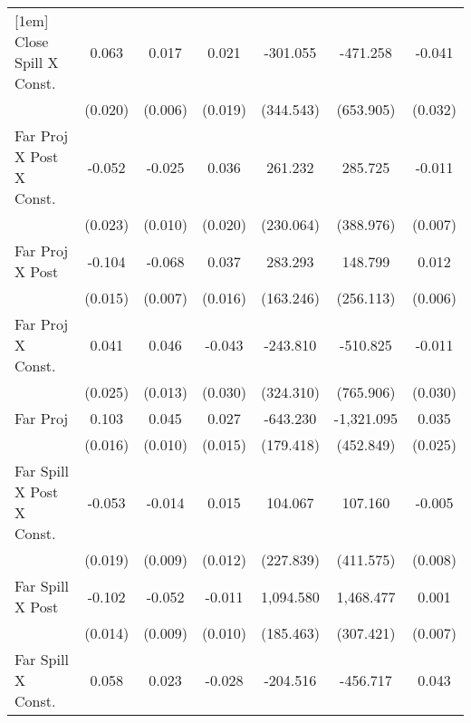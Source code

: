 {\begin{tabular}{l*{6}{c}}
[1em]
Close Spill X Const.&    0.063\sym{***}&    0.017\sym{***}&    0.021         & -301.055         & -471.258         &   -0.041         \\
                &  (0.020)         &  (0.006)         &  (0.019)         &(344.543)         &(653.905)         &  (0.032)         \\
[1em]
Far Proj X Post X Const.&   -0.052\sym{**} &   -0.025\sym{***}&    0.036\sym{*}  &  261.232         &  285.725         &   -0.011         \\
                &  (0.023)         &  (0.010)         &  (0.020)         &(230.064)         &(388.976)         &  (0.007)         \\
[1em]
Far Proj X Post &   -0.104\sym{***}&   -0.068\sym{***}&    0.037\sym{**} &  283.293\sym{*}  &  148.799         &    0.012\sym{**} \\
                &  (0.015)         &  (0.007)         &  (0.016)         &(163.246)         &(256.113)         &  (0.006)         \\
[1em]
Far Proj X Const.&    0.041         &    0.046\sym{***}&   -0.043         & -243.810         & -510.825         &   -0.011         \\
                &  (0.025)         &  (0.013)         &  (0.030)         &(324.310)         &(765.906)         &  (0.030)         \\
[1em]
Far Proj        &    0.103\sym{***}&    0.045\sym{***}&    0.027\sym{*}  & -643.230\sym{***}&-1,321.095\sym{***}&    0.035         \\
                &  (0.016)         &  (0.010)         &  (0.015)         &(179.418)         &(452.849)         &  (0.025)         \\
[1em]
Far Spill X Post X Const.&   -0.053\sym{***}&   -0.014         &    0.015         &  104.067         &  107.160         &   -0.005         \\
                &  (0.019)         &  (0.009)         &  (0.012)         &(227.839)         &(411.575)         &  (0.008)         \\
[1em]
Far Spill X Post&   -0.102\sym{***}&   -0.052\sym{***}&   -0.011         &1,094.580\sym{***}&1,468.477\sym{***}&    0.001         \\
                &  (0.014)         &  (0.009)         &  (0.010)         &(185.463)         &(307.421)         &  (0.007)         \\
[1em]
Far Spill X Const.&    0.058\sym{***}&    0.023\sym{***}&   -0.028         & -204.516         & -456.717         &    0.043\sym{**} \\

\end{tabular}}
